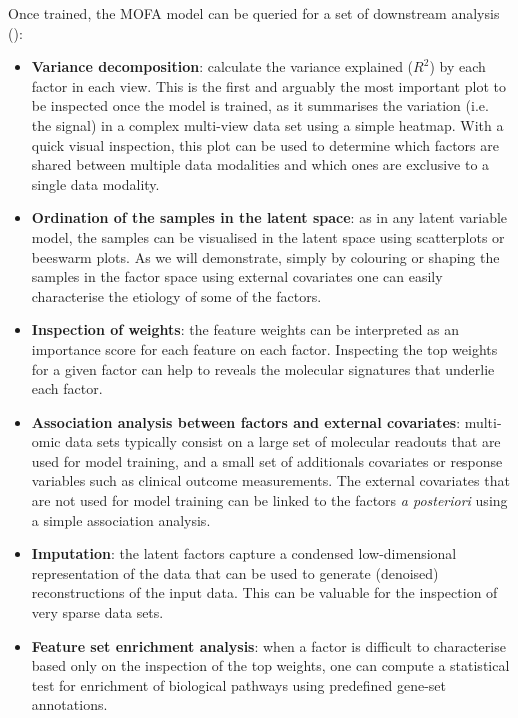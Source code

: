 Once trained, the MOFA model can be queried for a set of downstream analysis ():
\begin{itemize}
	\item \textbf{Variance decomposition}: calculate the variance explained ($R^2$) by each factor in each view. This is the first and arguably the most important plot to be inspected once the model is trained, as it summarises the variation (i.e. the signal) in a complex multi-view data set using a simple heatmap. With a quick visual inspection, this plot can be used to determine which factors are shared between multiple data modalities and which ones are exclusive to a single data modality.

	\item \textbf{Ordination of the samples in the latent space}: as in any latent variable model, the samples can be visualised in the latent space using scatterplots or beeswarm plots. As we will demonstrate, simply by colouring or shaping the samples in the factor space using external covariates one can easily characterise the etiology of some of the factors.

	\item \textbf{Inspection of weights}: the feature weights can be interpreted as an importance score for each feature on each factor. Inspecting the top weights for a given factor can help to reveals the molecular signatures that underlie each factor.

	\item \textbf{Association analysis between factors and external covariates}: multi-omic data sets typically consist on a large set of molecular readouts that are used for model training, and a small set of additionals covariates or response variables such as clinical outcome measurements. The external covariates that are not used for model training can be linked to the factors \textit{a posteriori} using a simple association analysis.

	\item \textbf{Imputation}: the latent factors capture a condensed low-dimensional representation of the data that can be used to generate (denoised) reconstructions of the input data. This can be valuable for the inspection of very sparse data sets.

	\item \textbf{Feature set enrichment analysis}: when a factor is difficult to characterise based only on the inspection of the top weights, one can compute a statistical test for enrichment of biological pathways using predefined gene-set annotations.

\end{itemize}

